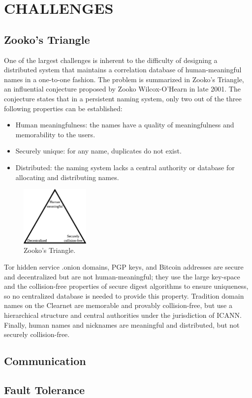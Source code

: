 
\chapter{CHALLENGES}

\section{Zooko's Triangle}

One of the largest challenges is inherent to the difficulty of designing a distributed system that maintains a correlation database of human-meaningful names in a one-to-one fashion. The problem is summarized in Zooko's Triangle, an influential conjecture proposed by Zooko Wilcox-O'Hearn in late 2001. The conjecture states that in a persistent naming system, only two out of the three following properties can be established:\cite{ferdous2009security}

\begin{itemize}
  \item Human meaningfulness: the names have a quality of meaningfulness and memorability to the users. 
  \item Securely unique: for any name, duplicates do not exist.
  \item Distributed: the naming system lacks a central authority or database for allocating and distributing names.
\end{itemize}

\begin{figure}[htbp]
	\centering
	\includegraphics[width=0.3\textwidth]{images/Zooko.eps}
	\caption{Zooko's Triangle.}
\end{figure}

Tor hidden service .onion domains, PGP keys, and Bitcoin addresses are secure and decentralized but are not human-meaningful; they use the large key-space and the collision-free properties of secure digest algorithms to ensure uniqueness, so no centralized database is needed to provide this property. Tradition domain names on the Clearnet are memorable and provably collision-free, but use a hierarchical structure and central authorities under the jurisdiction of ICANN. Finally, human names and nicknames are meaningful and distributed, but not securely collision-free.\cite{stiegler2005petname}

\section{Communication}



\section{Fault Tolerance}